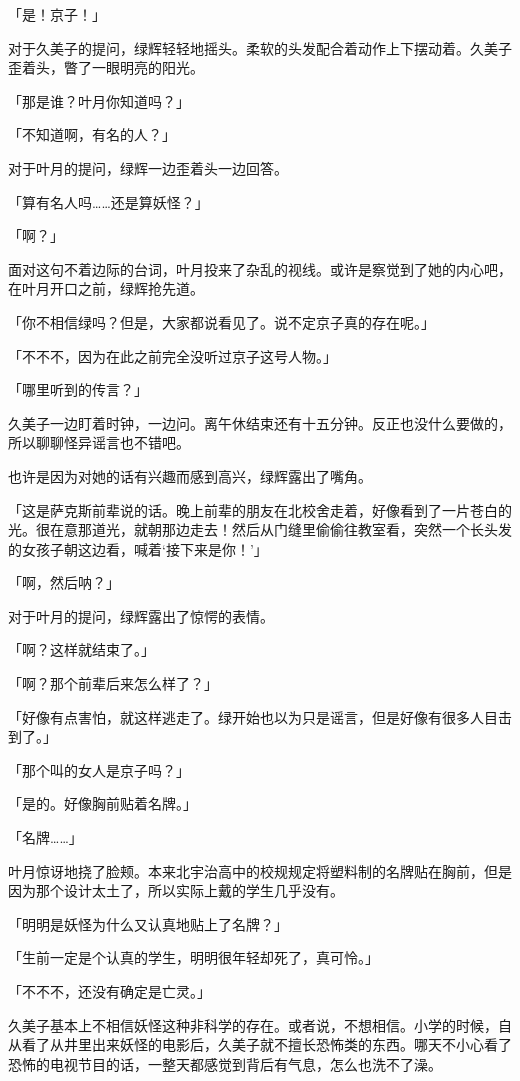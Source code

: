 \documentclass[UTF8]{ctexart}
\begin{document}
    「是！京子！」

    对于久美子的提问，绿辉轻轻地摇头。柔软的头发配合着动作上下摆动着。久美子歪着头，瞥了一眼明亮的阳光。

    「那是谁？叶月你知道吗？」

    「不知道啊，有名的人？」

    对于叶月的提问，绿辉一边歪着头一边回答。

    「算有名人吗……还是算妖怪？」

    「啊？」

    面对这句不着边际的台词，叶月投来了杂乱的视线。或许是察觉到了她的内心吧，在叶月开口之前，绿辉抢先道。

    「你不相信绿吗？但是，大家都说看见了。说不定京子真的存在呢。」

    「不不不，因为在此之前完全没听过京子这号人物。」

    「哪里听到的传言？」

    久美子一边盯着时钟，一边问。离午休结束还有十五分钟。反正也没什么要做的，所以聊聊怪异谣言也不错吧。

    也许是因为对她的话有兴趣而感到高兴，绿辉露出了嘴角。

    「这是萨克斯前辈说的话。晚上前辈的朋友在北校舍走着，好像看到了一片苍白的光。很在意那道光，就朝那边走去！然后从门缝里偷偷往教室看，突然一个长头发的女孩子朝这边看，喊着‘接下来是你！’」

    「啊，然后呐？」

    对于叶月的提问，绿辉露出了惊愕的表情。

    「啊？这样就结束了。」

    「啊？那个前辈后来怎么样了？」

    「好像有点害怕，就这样逃走了。绿开始也以为只是谣言，但是好像有很多人目击到了。」

    「那个叫的女人是京子吗？」

    「是的。好像胸前贴着名牌。」

    「名牌……」

    叶月惊讶地挠了脸颊。本来北宇治高中的校规规定将塑料制的名牌贴在胸前，但是因为那个设计太土了，所以实际上戴的学生几乎没有。

    「明明是妖怪为什么又认真地贴上了名牌？」

    「生前一定是个认真的学生，明明很年轻却死了，真可怜。」

    「不不不，还没有确定是亡灵。」

    久美子基本上不相信妖怪这种非科学的存在。或者说，不想相信。小学的时候，自从看了从井里出来妖怪的电影后，久美子就不擅长恐怖类的东西。哪天不小心看了恐怖的电视节目的话，一整天都感觉到背后有气息，怎么也洗不了澡。
\end{document}

